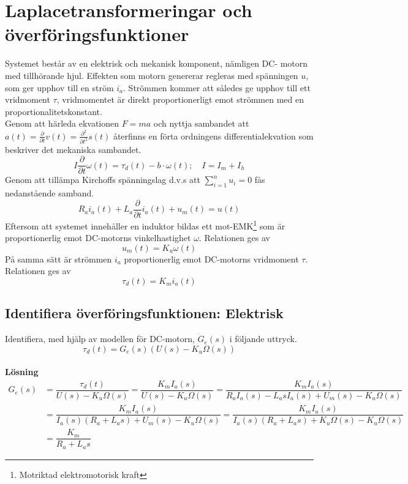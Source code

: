 \documentclass[11pt]{article}
\begin{document}

\tableofcontents
\pagestyle{empty}
\newpage
\setcounter{page}{1}
\pagestyle{fancy}
\section{Laplacetransformeringar och överföringsfunktioner}
Systemet består av en elektrisk och mekanisk komponent, nämligen DC- motorn med tillhörande hjul. Effekten som motorn genererar regleras med spänningen $u$, som ger upphov till en ström $i_a$. Strömmen kommer att således ge upphov till ett vridmoment $\tau$, vridmomentet är direkt proportionerligt emot strömmen med en proportionalitetskonstant.
\\[2em]

Genom att härleda ekvationen $F=ma$ och nyttja sambandet att $a(t) = \frac{\partial}{\partial t}v(t) = \frac{\partial^2}{\partial t^2}s(t)$ återfinns en förta ordningens differentialekvation som beskriver det mekaniska sambandet.
\begin{equation}
I\dfrac{\partial}{\partial t}\omega(t) = \tau_d(t)-b\cdot\omega(t); \quad I = I_m +I_h
\end{equation}
Genom att tillämpa Kirchoffs spänningslag d.v.s att $\sum\limits_{i=1}^{n} u_i = 0$ fås nedanstående samband.
\begin{equation}
R_ai_a(t)+L_a\dfrac{\partial}{\partial t}i_a(t) + u_m(t) = u(t)
\end{equation}
Eftersom att systemet innehåller en induktor bildas ett mot-EMK\footnote{Motriktad elektromotorisk kraft} som är proportionerlig emot DC-motorns vinkelhastighet $\omega$. Relationen ges av
\begin{equation}
u_m(t) = K_u\omega(t)
\end{equation}
På samma sätt är strömmen $i_a$ proportionerlig emot DC-motorns vridmoment $\tau$. Relationen ges av
\begin{equation}
\tau_d(t) = K_mi_a(t)
\end{equation}
\subsection{Identifiera överföringsfunktionen: Elektrisk}
Identifiera, med hjälp av modellen för DC-motorn, $G_e(s)$ i följande uttryck.
$$\tau_d(t) = G_e(s)(U(s)-K_u\Omega(s))$$ \\[0.5em]
\textbf{Lösning}
\begin{equation*}
\begin{split}
G_e(s)&= \dfrac{\tau_d(t)}{U(s)-K_u\Omega(s)} =\dfrac{K_mI_a(s)}{U(s)-K_u\Omega(s)} = \dfrac{K_mI_a(s)}{R_aI_a(s)-L_asI_a(s)+U_m(s)-K_u\Omega(s)}\\
&=\dfrac{K_mI_a(s)}{I_a(s)(R_a+L_as)+U_m(s)-K_u\Omega(s)}= \dfrac{K_mI_a(s)}{I_a(s)(R_a+L_as)+K_u\Omega(s)-K_u\Omega(s)}\\
&=\dfrac{K_m}{R_a+L_as}
\end{split}
\end{equation*}
\newpage
\end{document}
